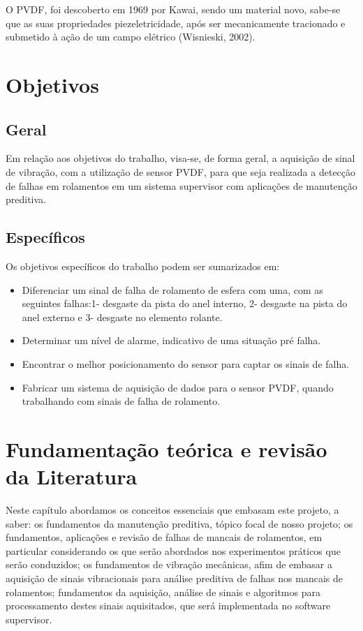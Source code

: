 \documentclass[
	12pt,				
	oneside,			
	a4paper,			
	english,			
	brazil				
	]{abntex2ppgsi}
\begin{document}
O PVDF, foi descoberto em 1969 por Kawai, sendo um material novo, sabe-se que as suas propriedades piezeletricidade, após ser mecanicamente tracionado e submetido à ação de um campo elétrico (Wisnieski, 2002).

\chapter{Objetivos}

\section{\textbf {Geral}}

Em relação aos objetivos do trabalho, visa-se, de forma geral, a aquisição de sinal de vibração, com a utilização de sensor PVDF, para que seja realizada a detecção de falhas em rolamentos em um sistema supervisor com aplicações de manutenção preditiva.

\section{\textbf {Específicos}}

Os objetivos específicos do trabalho podem ser sumarizados em:

\begin{itemize}
	\item Diferenciar um sinal de falha de rolamento de esfera com uma, com as seguintes falhas:1- desgaste da pista do anel interno, 2- desgaste na pista do anel externo e 3- desgaste no elemento rolante.
	\item Determinar um nível de alarme, indicativo de uma situação pré falha.
	\item Encontrar o melhor posicionamento do sensor para captar os sinais de falha.\
	\item Fabricar um sistema de aquisição de dados para o sensor PVDF, quando trabalhando com sinais de falha de rolamento.
\end{itemize}

\chapter{Fundamentação teórica e revisão da Literatura}
Neste capítulo abordamos os conceitos essenciais que embasam este projeto, a saber: os fundamentos da manutenção preditiva, tópico focal de nosso projeto; os fundamentos, aplicações e revisão de falhas de mancais de rolamentos, em particular considerando os que serão abordados nos experimentos práticos que serão conduzidos; os fundamentos de vibração mecânicas, afim de embasar a aquisição de sinais vibracionais para análise preditiva de falhas nos mancais de rolamentos; fundamentos da aquisição, análise de sinais e algoritmos para processamento destes sinais aquisitados, que será implementada no software supervisor.
\end{document}
